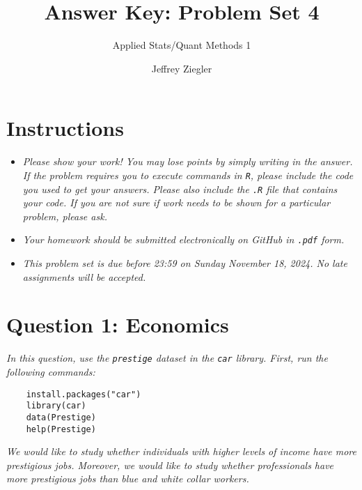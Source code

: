 \documentclass[12pt,letterpaper]{article}
\title{Answer Key: Problem Set 4}
\date{Jeffrey Ziegler}
\author{Applied Stats/Quant Methods 1}
\begin{document}
	\maketitle
	
	\section*{Instructions}
	\begin{itemize}
		\item \textit{Please show your work! You may lose points by simply writing in the answer. If the problem requires you to execute commands in \texttt{R}, please include the code you used to get your answers. Please also include the \texttt{.R} file that contains your code. If you are not sure if work needs to be shown for a particular problem, please ask.}
	\item \textit{Your homework should be submitted electronically on GitHub in \texttt{.pdf} form.}
	\item \textit{This problem set is due before 23:59 on Sunday November 18, 2024. No late assignments will be accepted.}
	\end{itemize}
		\vspace{.5cm}
	\section*{Question 1: Economics}
	\vspace{.25cm}
	\noindent 	\textit{In this question, use the \texttt{prestige} dataset in the \texttt{car} library. First, run the following commands:}
	
	\begin{verbatim}
	install.packages("car")
	library(car)
	data(Prestige)
	help(Prestige)
	\end{verbatim} 
	
	
	\noindent \textit{We would like to study whether individuals with higher levels of income have more prestigious jobs. Moreover, we would like to study whether professionals have more prestigious jobs than blue and white collar workers.}
	
\end{document}

